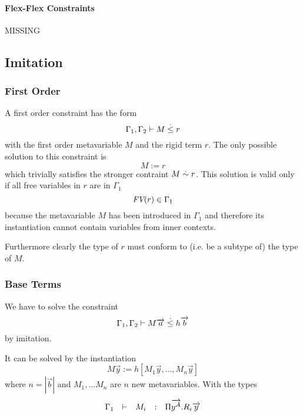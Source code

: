 \paragraph{Flex-Flex Constraints}

MISSING














\subsection{Imitation}




\subsubsection {First Order}



A first order constraint has the form
$$
    \Gamma_1, \Gamma_2 \vdash M \stackrel . \le r
$$
with the first order metavariable $M$ and the rigid term $r$. The only possible
solution to this constraint is
$$
    M := r
$$
which trivially satisfies the stronger contraint $M \stackrel . \sim r$. This solution is
valid only if all free variables in $r$ are in $\Gamma_1$
$$
    {\text{\it FV}}(r) \in \Gamma_1
$$
because the metavariable $M$ has been introduced in $\Gamma_1$ and therefore its
instantiation cannot contain variables from inner contexts.

Furthermore clearly the type of $r$ must conform to (i.e. be a subtype of) the
type of $M$.







\subsubsection {Base Terms}

We have to solve the constraint
$$
    \Gamma_1, \Gamma_2 \vdash M {\overrightarrow {a}} \stackrel . \le h {\overrightarrow {b}}
$$
by imitation.

It can be solved by the instantiation
$$
    M \vec y := h [M_1 \vec y, \ldots, M_n \vec y]
$$
where $n = |\vec b|$ and $M_1, \ldots M_n$ are $n$ new metavariables. With the
types
$$
    \begin{array}{lllll} 
        \Gamma_1 &\vdash& M_i &:& \Pi {\overrightarrow {y^A}}. R_i {\overrightarrow {y}}
     \end{array}
$$

